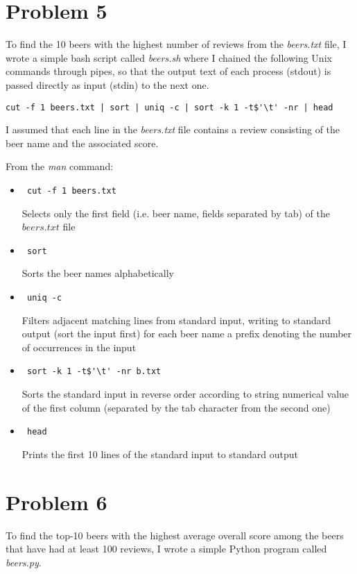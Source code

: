 \documentclass[11pt]{article}
\begin{document}
\newpage
\section{Problem 5}
To find the 10 beers with the highest number of reviews from the \textit{beers.txt} file,
I wrote a simple bash script called \textit{beers.sh} where I chained the following Unix commands through pipes, so that the output text of each process (stdout) is passed directly as input (stdin) to the next one.

\begin{verbatim}
cut -f 1 beers.txt | sort | uniq -c | sort -k 1 -t$'\t' -nr | head
\end{verbatim}

\bigskip
I assumed that each line in the \textit{beers.txt} file contains a review consisting of the beer name and the associated score. \newline

\bigskip
From the \textit{man} command:
\begin{itemize}
  \item \begin{verbatim} cut -f 1 beers.txt \end{verbatim} Selects only the first field (i.e. beer name, fields separated by tab) of the $beers.txt$ file
  \item \begin{verbatim} sort \end{verbatim} Sorts the beer names alphabetically
  \item \begin{verbatim} uniq -c \end{verbatim} Filters adjacent matching lines from standard input, writing to standard output (sort the input first)
    for each beer name a prefix denoting the number of occurrences in the input
  \item \begin{verbatim} sort -k 1 -t$'\t' -nr b.txt \end{verbatim} Sorts the standard input in reverse order according to string numerical value
    of the first column (separated by the tab character from the second one)
  \item \begin{verbatim} head \end{verbatim} Prints the first 10 lines of the standard input to standard output
\end{itemize}


\newpage
\section{Problem 6}
To find the top-10 beers with the highest average overall score among the beers that have had at least 100 reviews,
I wrote a simple Python program called \textit{beers.py}.
\end{document}
